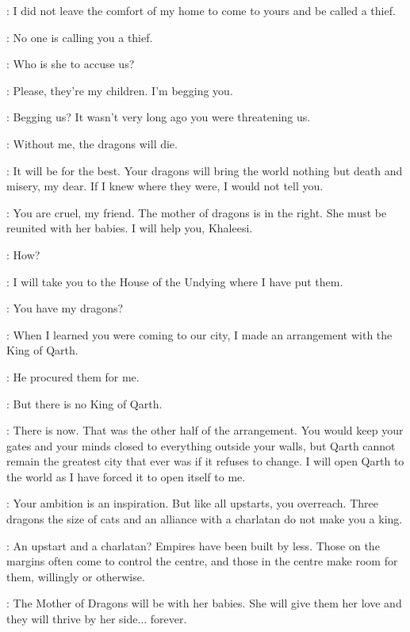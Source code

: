 \SPICEKING: I did not leave the comfort of my home to come to yours and be called a thief.

\XARO: No one is calling you a thief.

\SPICEKING: Who is she to accuse us?

\DAENERYS: Please, they're my children. I'm begging you.

\SILKKING: Begging us? It wasn't very long ago you were threatening us.

\DAENERYS: Without me, the dragons will die.

\SPICEKING: It will be for the best. Your dragons will bring the world nothing but death and misery, my dear. If I knew where they were, I would not tell you.

\PYAT: You are cruel, my friend. The mother of dragons is in the right. She must be reunited with her babies. I will help you, Khaleesi.

\DAENERYS: How?

\PYAT: I will take you to the House of the Undying where I have put them.

\DAENERYS: You have my dragons?

\PYAT: When I learned you were coming to our city, I made an arrangement with the King of Qarth.


\PYAT: He procured them for me.

\DAENERYS: But there is no King of Qarth.


\XARO: There is now. That was the other half of the arrangement. You would keep your gates and your minds closed to everything outside your walls, but Qarth cannot remain the greatest city that ever was if it refuses to change. I will open Qarth to the world as I have forced it to open itself to me.

\SPICEKING: Your ambition is an inspiration. But like all upstarts, you overreach. Three dragons the size of cats and an alliance with a charlatan do not make you a king.

\XARO: An upstart and a charlatan? Empires have been built by less. Those on the margins often come to control the centre, and those in the centre make room for them, willingly or otherwise.

\PYAT: The Mother of Dragons will be with her babies. She will give them her love and they will thrive by her side$\ldots$ forever.


